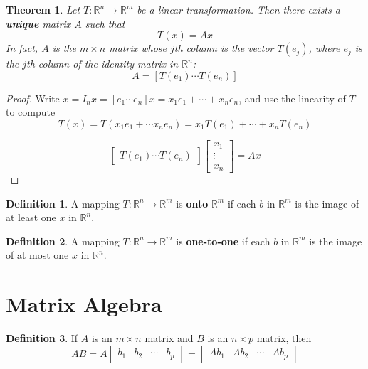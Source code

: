 \documentclass[letterpaper]{article}
\newtheorem{theorem}{Theorem}
\theoremstyle{definition}
\newtheorem{definition}{Definition}[section]
\begin{document}
\begin{theorem}
Let $T: \mathbb{R}^n \rightarrow \mathbb{R}^m$ be a linear transformation. Then there exists a \textbf{unique} matrix $A$ such that 
$$ T(x) = Ax $$
In fact, $A$ is the $m \times n$ matrix whose $j$th column is the vector $T(e_j)$, where $e_j$ is the $j$th column of the identity matrix in $\mathbb{R}^n$: 
$$A = [T(e_1) \cdots T(e_n)]$$
\end{theorem}

\begin{proof}
Write $x = I_n x = [e_1 \cdots e_n]x = x_1 e_1 + \cdots + x_n e_n$, and use the linearity of $T$ to compute 
$$T(x) = T(x_1 e_1 + \cdots x_n e_n) = x_1 T(e_1) + \cdots + x_n T(e_n)$$ 

$$ \begin{bmatrix}
T(e_1) \cdots T(e_n)
\end{bmatrix} 
\begin{bmatrix}
x_1 \\
\vdots \\
x_n
\end{bmatrix} 
= Ax
$$ 
\end{proof}

\begin{definition}
A mapping $T: \mathbb{R}^n \rightarrow \mathbb{R}^m$ is \textbf{onto} $\mathbb{R}^m$ if each $b$ in $\mathbb{R}^m$ is the image of at least one $x$ in $\mathbb{R}^n$. 
\end{definition}

\begin{definition}
A mapping $T: \mathbb{R}^n \rightarrow \mathbb{R}^m$ is \textbf{one-to-one} if each $b$ in $\mathbb{R}^m$ is the image of at most one $x$ in $\mathbb{R}^n$. 
\end{definition}

\section{Matrix Algebra} 
\begin{definition}
If $A$ is an $m \times n$ matrix and $B$ is an $n \times p$ matrix, then 
$$AB = A
\begin{bmatrix}
b_1 & b_2 & \cdots & b_p
\end{bmatrix}
= \begin{bmatrix}
Ab_1 & Ab_2 & \cdots & Ab_p
\end{bmatrix}$$
\end{definition}
\end{document}
